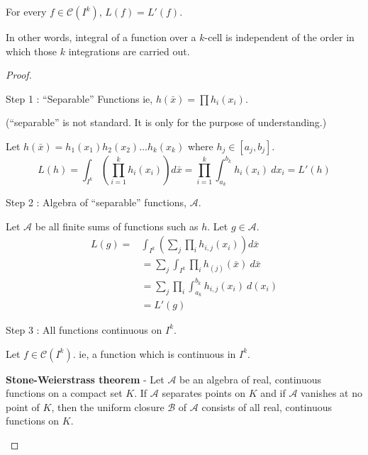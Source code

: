 \begin{theorem}
	For every $f \in \mathscr{C}(I^k)$, $L(f) = L'(f)$.

\begin{commentary}
	In other words, integral of a function over a $k$-cell is independent of the order in which those $k$ integrations are carried out.
\end{commentary}
\end{theorem}
\begin{proof}
\begin{commentary}Step 1 : ``Separable'' Functions ie, $h(\bar{x}) = \prod h_i(x_i)$.\end{commentary}

\begin{commentary}
	(``separable'' is not standard.
	It is only for the purpose of understanding.)
\end{commentary}

Let $h(\bar{x}) = h_1(x_1)h_2(x_2)\dots h_k(x_k)$ where $h_j \in [a_j,b_j]$.
	\[ L(h) = \int_{I^k} \left(\prod_{i = 1}^k h_i(x_i)\right) d\bar{x} = \prod_{i = 1}^k \int_{a_k}^{b_k} h_i(x_i)\ dx_i = L'(h) \]
\begin{commentary}Step 2 : Algebra of ``separable'' functions, $\mathscr{A}$.\end{commentary}

Let $\mathscr{A}$ be all finite sums of functions such as $h$.
Let $g \in \mathscr{A}$.
\begin{align*}
	L(g) = & \int_{I^k} \left(\sum_j \prod_i h_{i,j}(x_i) \right) d\bar{x} \\
	& = \sum_j \int_{I^k} \prod_i h_{(j)}(\bar{x})\ d\bar{x}\\
	& = \sum_j \prod_i \int_{a_k}^{b_k} h_{i,j}(x_i)\ d(x_i)\\
	& = L'(g)
\end{align*}
\begin{commentary}Step 3 : All functions continuous on $I^k$.\end{commentary}

Let $f \in \mathscr{C}(I^k)$.
ie, a function which is continuous in $I^k$.

\begin{commentary}
	\textbf{Stone-Weierstrass theorem} - Let $\mathscr{A}$ be an algebra of real, continuous functions on a compact set $K$.
	If $\mathscr{A}$ separates points on $K$ and if $\mathscr{A}$ vanishes at no point of $K$, then the uniform closure $\mathscr{B}$ of $\mathscr{A}$ consists of all real, continuous functions on $K$.


\end{commentary}
\end{proof}
